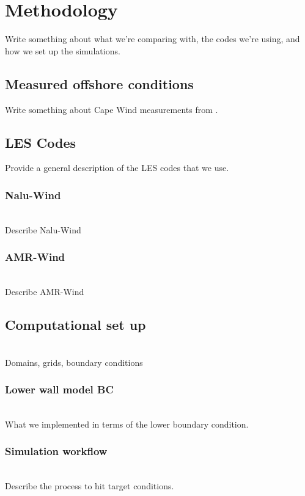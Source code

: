 \section{Methodology}
Write something about what we're comparing with, the codes we're
using, and how we set up the simulations.

\subsection{Measured offshore conditions}

Write something about Cape Wind measurements from \cite{archer2016predominance}.

\subsection{LES Codes}
Provide a general description of the LES codes that we use.

\subsubsection{Nalu-Wind}
\\
Describe Nalu-Wind

\subsubsection{AMR-Wind}
\\
Describe AMR-Wind

\subsection{Computational set up}
\\
Domains, grids, boundary conditions

\subsubsection{Lower wall model BC}
\\
What we implemented in terms of the lower boundary condition.

\subsubsection{Simulation workflow}
\\
Describe the process to hit target conditions.




